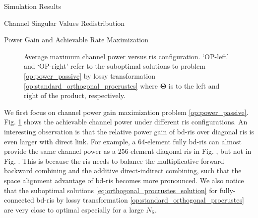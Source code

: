 \documentclass[journal]{IEEEtran}
\begin{document}
\begin{section}{Simulation Results}
\begin{subsection}{Channel Singular Values Redistribution}
	\end{subsection}

	\begin{subsection}{Power Gain and Achievable Rate Maximization}
		\begin{figure}[!t]
			\centering
			\caption{
				Average maximum channel power versus \gls{ris} configuration.
				`OP-left' and `OP-right' refer to the suboptimal solutions to problem \eqref{op:power_passive} by lossy transformation \eqref{op:standard_orthogonal_procrustes} where $\mathbf{\Theta}$ is to the left and right of the product, respectively.
			}
			\label{fg:power_sx}
		\end{figure}

		We first focus on channel power gain maximization problem \eqref{op:power_passive}.
		Fig. \ref{fg:power_sx} shows the achievable channel power under different \gls{ris} configurations.
		An interesting observation is that the relative power gain of \gls{bd}-\gls{ris} over diagonal \gls{ris} is even larger with direct link.
		For example, a 64-element fully \gls{bd}-\gls{ris} can almost provide the same channel power as a 256-element diagonal \gls{ris} in Fig. , but not in Fig. .
		This is because the \gls{ris} needs to balance the multiplicative forward-backward combining and the additive direct-indirect combining, such that the space alignment advantage of \gls{bd}-\gls{ris} becomes more pronounced.
		We also notice that the suboptimal solutions \eqref{eq:orthogonal_procrustes_solution} for fully-connected \gls{bd}-\gls{ris} by lossy transformation \eqref{op:standard_orthogonal_procrustes} are very close to optimal especially for a large $N_\mathrm{S}$.


\end{subsection}
\end{section}
\end{document}
